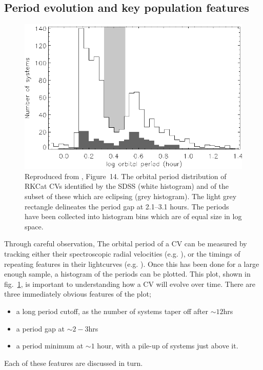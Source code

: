 \subsection{Period evolution and key population features}
\label{sect:introduction:period distribution key features}
\begin{figure}
    \centering
    \includegraphics[width=\columnwidth]{figures/introduction/pd-rk.eps}
    \caption{Reproduced from \citet{southworth2015}, Figure~14. The orbital period distribution of RKCat \citep{RKCat} CVs identified by the SDSS (white histogram) and of the subset of these which are eclipsing (grey histogram). The light grey rectangle delineates the period gap at 2.1–3.1 hours. The periods have been collected into histogram bins which are of equal size in log space.}
    \label{fig:period hist}
\end{figure}

Through careful observation, The orbital period of a CV can be measured by tracking either their spectroscopic radial velocities (e.g. \citealt{gaensicke2009}), or the timings of repeating features in their lightcurves (e.g. \citealt{Littlefair2008}). Once this has been done for a large enough sample, a histogram of the periods can be plotted. This plot, shown in fig.~\ref{fig:period hist}, is important to understanding how a CV will evolve over time.
There are three immediately obvious features of the plot;
\begin{itemize}
    \item a long period cutoff, as the number of systems taper off after $\sim12$hrs
    \item a period gap at $\sim2-3$hrs
    \item a period minimum at $\sim1$ hour, with a pile-up of systems just above it.
\end{itemize}
Each of these features are discussed in turn.

